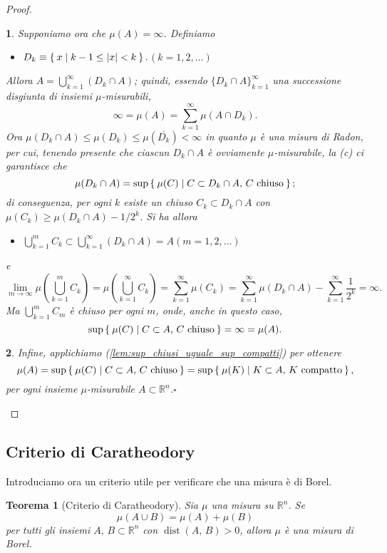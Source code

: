 \documentclass[a4paper,10pt,openright,oneside]{book}
\theoremstyle{theoremstyle}
\newtheorem{teorema}{Teorema}[section]
\theoremstyle{theoremstylewoheader}
\theoremstyle{theoremstyle}
\theoremstyle{proofsecstyle}
\newtheorem{proofsec}{}
\theoremstyle{nonumberplain}
\newtheorem{proof}{Dim.}
\newcommand{\RR}{\ensuremath{\mathbb{R}}}
\newcommand{\abs}[1]{\ensuremath{\lvert #1 \rvert}}
\newcommand{\closure}[1]{\ensuremath{\overline{#1}}}
\DeclareMathOperator{\dist}{dist}
\renewcommand{\qedsymbol}{\ensuremath{\square}}
\newcommand{\qed}{\unskip\nobreak\hfill\nobreak\hspace{.5em}\qedsymbol}
\newcommand{\mymath}[2]{\begin{itemize}%
  \item[]\hfill\hbox{}\ensuremath{\displaystyle #1}\hfill\ensuremath{\displaystyle #2}%
  \end{itemize}}
\begin{document}
\begin{proof}
\begin{proofsec}
Supponiamo ora che $\mu(A) = \infty$. Definiamo \mymath{D_k \equiv \Set{ x | k-1 \le \abs{x} < k }.}{(k = 1, 2, \ldots)} Allora $A = \bigcup_{k=1}^\infty (D_k \cap A)$; quindi, essendo $\{D_k \cap A\}_{k=1}^\infty$ una successione \emph{disgiunta} di insiemi $\mu$-misurabili,
\[
\infty = \mu(A) = \sum_{k=1}^\infty \mu(A \cap D_k).
\]
Ora $\mu(D_k \cap A) \le \mu(D_k) \le \mu(\closure{D_k}) < \infty$ in quanto $\mu$ è una misura di Radon, per cui, tenendo presente che ciascun $D_k \cap A$ è ovviamente $\mu$-misurabile, la (c) ci garantisce che
\[
\mu(D_k \cap A) = \sup\Set{ \mu(C) | C \subset D_k \cap A,\, C \text{ chiuso} };
\]
di conseguenza, per ogni $k$ esiste un chiuso $C_k \subset D_k \cap A$ con $\mu(C_k) \ge \mu(D_k \cap A) - 1/2^k$. Si ha allora
\mymath{\bigcup_{k=1}^m C_k \subset \bigcup_{k=1}^\infty (D_k \cap A) = A}{(m = 1, 2, \ldots)}
e
\[
\lim_{m \to \infty} \mu\left(\bigcup_{k=1}^m C_k\right) = \mu\left(\bigcup_{k=1}^\infty C_k\right) = \sum_{k=1}^\infty \mu(C_k) = \sum_{k=1}^\infty \mu(D_k \cap A) - \sum_{k=1}^\infty \frac{1}{2^k} = \infty.
\]
Ma $\bigcup_{k=1}^m C_m$ è chiuso per ogni $m$, onde, anche in questo caso,
\[
\sup\Set{ \mu(C) | C \subset A,\, C \text{ chiuso} } = \infty = \mu(A).
\]
\end{proofsec}

\begin{proofsec}
Infine, applichiamo (\ref{lem:sup_chiusi_uguale_sup_compatti}) per ottenere
\[
\mu(A) = \sup\Set{ \mu(C) | C \subset A,\, C \text{ chiuso} } = \sup\Set{ \mu(K) | K \subset A,\, K \text{ compatto} },
\]
per ogni insieme $\mu$-misurabile $A \subset \RR^n$.\qed
\end{proofsec}
\end{proof}

\subsection{Criterio di Caratheodory}

Introduciamo ora un criterio utile per verificare che una misura è di Borel.

\begin{teorema}[Criterio di Caratheodory]
\label{thm:criterio_caratheodory}
Sia $\mu$ una misura su $\RR^n$. Se
\[
\mu(A \cup B) = \mu(A) + \mu(B)
\]
per tutti gli insiemi $A,\, B \subset \RR^n$ con $\dist(A,\, B) > 0$, allora $\mu$ è una misura di Borel.
\end{teorema}
\end{document}
